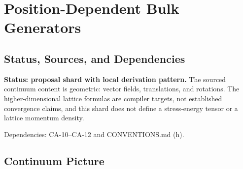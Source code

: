 
\section{Position-Dependent Bulk Generators}
\label{sec:position-dependent-bulk-generators}

\subsection{Status, Sources, and Dependencies}

\textbf{Status: proposal shard with local derivation pattern.}  The sourced
continuum content is geometric: vector fields, translations, and rotations.
The higher-dimensional lattice formulas are compiler targets, not established
convergence claims, and this shard does not define a stress-energy tensor or a
lattice momentum density.

Dependencies: CA-10--CA-12 and CONVENTIONS.md (h).


\subsection{Continuum Picture}

